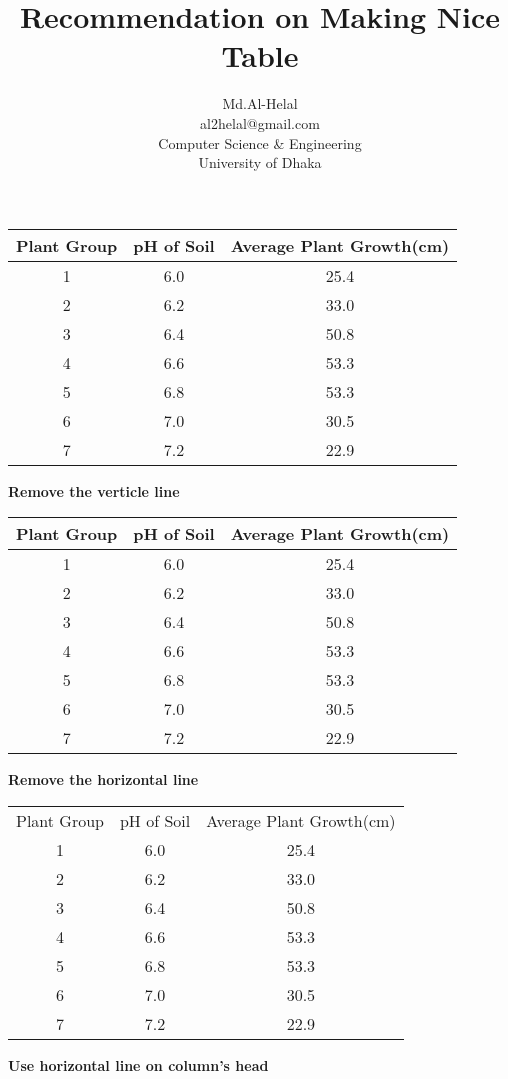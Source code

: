 \documentclass[a4paper,12pt]{article}
\title{Recommendation on Making Nice Table}
\author{Md.Al-Helal\\al2helal@gmail.com\\Computer Science \& Engineering\\University of Dhaka}
\begin{document}
\maketitle
\centering
\begin{tabular}{|c|c|c|}
\hline
Plant Group & pH of Soil & Average Plant Growth(cm)\\
\hline
1 & 6.0 & 25.4\\
\hline
2 & 6.2 & 33.0\\
\hline
3 & 6.4 & 50.8\\
\hline
4 & 6.6 & 53.3\\
\hline
5 & 6.8 & 53.3\\
\hline
6 & 7.0 & 30.5\\
\hline
7 & 7.2 & 22.9\\
\hline
\end{tabular}
\textbf{Remove the verticle line}

\begin{tabular}{ccc}
\toprule
Plant Group & pH of Soil & Average Plant Growth(cm)\\
\toprule
1 & 6.0 & 25.4\\
\hline
2 & 6.2 & 33.0\\
\hline
3 & 6.4 & 50.8\\
\hline
4 & 6.6 & 53.3\\
\hline
5 & 6.8 & 53.3\\
\hline
6 & 7.0 & 30.5\\
\hline
7 & 7.2 & 22.9\\
\bottomrule
\end{tabular}
\textbf{Remove the horizontal line}

\begin{tabular}{ccc}
Plant Group & pH of Soil & Average Plant Growth(cm)\\
1 & 6.0 & 25.4\\
2 & 6.2 & 33.0\\
3 & 6.4 & 50.8\\
4 & 6.6 & 53.3\\
5 & 6.8 & 53.3\\
6 & 7.0 & 30.5\\
7 & 7.2 & 22.9\\
\end{tabular}
\textbf{Use horizontal line on column's head}
\end{document}
